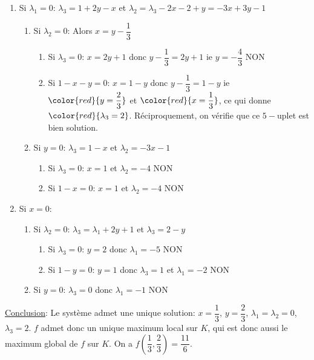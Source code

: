 \documentclass{fancybook}
\begin{document}
\begin{enumerate}
\item Si $\lambda_1=0$:\newline
$\lambda_3 = 1+2y-x$ et $\lambda_2 = \lambda_3 - 2x-2+y = -3x+3y-1$
\begin{enumerate}
\item Si $\lambda_2=0$: \newline
Alors $x=y-\dfrac 13$
\begin{enumerate}
\item Si $\lambda_3=0$:\newline
$x=2y+1$ donc $y-\dfrac 13 = 2y+1$ ie $y=-\dfrac 43$ \quad NON
\item Si $1-x-y=0$:\newline
$x=1-y$ donc $y-\dfrac 13=1-y$ ie $\color{red}{y=\dfrac 23}$ et $\color{red}{x=\dfrac 13}$, ce qui donne $\color{red}{\lambda_3=2}$. Réciproquement, on vérifie que ce $5-$uplet est bien solution.
\end{enumerate}
\item Si $y=0$: \newline
$\lambda_3=1-x$ et $\lambda_2=-3x-1$
\begin{enumerate}
\item Si $\lambda_3=0$:\newline
$x=1$ et $\lambda_2=-4$ NON
\item Si $1-x=0$: \newline
$x=1$ et $\lambda_2=-4$ NON
\end{enumerate}
\end{enumerate}
\item Si $x=0$:
\begin{enumerate}
\item Si $\lambda_2 = 0$: \newline
$\lambda_3=\lambda_1+2y+1$ et $\lambda_3=2-y$
\begin{enumerate}
\item Si $\lambda_3 = 0$:\newline
$y=2$ donc $\lambda_1=-5$ NON
\item Si $1-y=0$:\newline
$y=1$ donc $\lambda_3=1$ et $\lambda_1=-2$ NON
\end{enumerate}
\item Si $y=0$: \newline
$\lambda_3=0$ donc $\lambda_1=-1$ NON
\end{enumerate}
\end{enumerate}
\underline{Conclusion}: Le système admet une unique solution: $x=\dfrac 13$, $y=\dfrac 23$, $\lambda_1=\lambda_2=0$, $\lambda_3=2$. $f$ admet donc un unique maximum local sur $K$, qui est donc aussi le maximum global de $f$ sur $K$. On a $f(\dfrac 13, \dfrac 23)=\dfrac{11}6$.
\end{document}
